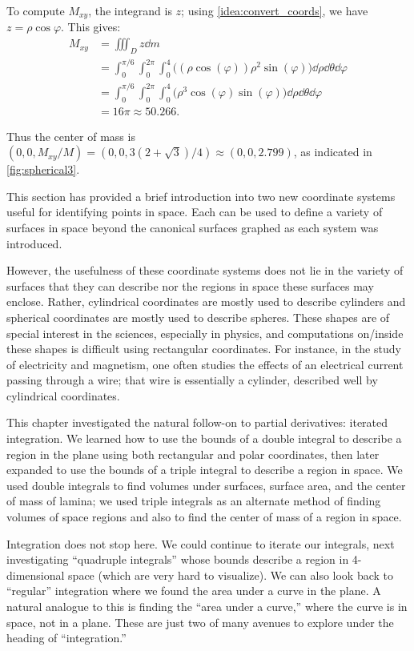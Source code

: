 \begin{example}
To compute $M_{xy}$, the integrand is $z$; using \autoref{idea:convert_coords}, we have $z = \rho\cos\varphi$. This gives:
\begin{align*}
M_{xy} &= \iiint_D z\dd m \\
	&= \int_0^{\pi/6}\int_0^{2\pi}\int_0^4 \bigl((\rho\cos(\varphi))\rho^2\sin(\varphi)\bigr) \dd\rho\dd\theta\dd\varphi\\
	&= \int_0^{\pi/6}\int_0^{2\pi}\int_0^4 \bigl(\rho^3\cos(\varphi)\sin(\varphi)\bigr) \dd\rho\dd\theta\dd\varphi\\
	&=16\pi \approx 50.266.
\end{align*}

Thus the center of mass is $(0,0,M_{xy}/M)=(0,0,3(2+\sqrt3)/4) \approx (0,0,2.799)$, as indicated in \autoref{fig:spherical3}.
\end{example}



This section has provided a brief introduction into two new coordinate systems useful for identifying points in space. Each can be used to define a variety of surfaces in space beyond the canonical surfaces graphed as each system was introduced.

However, the usefulness of these coordinate systems does not lie in the variety of surfaces that they can describe nor the regions in space these surfaces may enclose. Rather,  cylindrical coordinates are mostly used to describe cylinders and spherical coordinates are mostly used to describe spheres. These shapes are of special interest in the sciences, especially in physics, and computations on/inside these shapes is difficult using rectangular coordinates. For instance, in the study of electricity and magnetism, one often studies the effects of an electrical current passing through a wire; that wire is essentially a cylinder, described well by cylindrical coordinates.\bigskip

This chapter investigated the natural follow-on to partial derivatives: iterated integration. We learned how to use the bounds of a double integral to describe a region in the plane using both rectangular and polar coordinates, then later expanded to use the bounds of a triple integral to describe a region in space. We used double integrals to find volumes under surfaces, surface area, and the center of mass of lamina; we used triple integrals as an alternate method of finding volumes of space regions and also to find the center of mass of a region in space.

Integration does not stop here. We could continue to iterate our integrals, next investigating ``quadruple integrals'' whose bounds describe a region in 4-dimensional space (which are very hard to visualize). We can also look back to ``regular'' integration where we found the area under a curve in the plane. A natural analogue to this is finding the ``area under a curve,'' where the curve is in space, not in a plane. These are just two of many avenues to explore under the heading of ``integration.''

